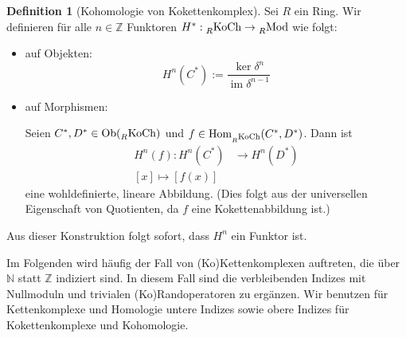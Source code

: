 \documentclass[a4paper,twoside,10pt]{scrreprt}
\DeclareMathOperator{\img}{im}
\newcommand{\Z}{\mathbb{Z}}
\newcommand{\N}{\mathbb{N}}
\theoremstyle{definition}
\newtheorem{definition}[satz]{Definition}
\begin{document}
\begin{definition}[Kohomologie von Kokettenkomplex]\label{def:DefCohomCochain}
Sei $R$ ein Ring. Wir definieren für alle $n\in \Z$ Funktoren $H^*:\prescript{}{R}{\text{KoCh}}\to \prescript{}{R}{\text{Mod}}$ wie folgt:
\begin{itemize}
\item auf Objekten:
\begin{equation*}
H^n(C^*):=\frac{\ker\delta^n}{\img\delta^{n-1}}
\end{equation*}
\item auf Morphismen:\par
Seien $C^*,D^*\in \text{Ob}(\prescript{}{R}{\text{KoCh}})$ und $f\in \text{Hom}_{\prescript{}{R}{\text{KoCh}}}(C^*,D^*)$. Dann ist 
\begin{align*}
H^n(f):H^n(C^*)&\to H^n(D^*)\\
[x]\mapsto [f(x)]
\end{align*}
eine wohldefinierte, lineare Abbildung. (Dies folgt aus der universellen Eigenschaft von Quotienten, da $f$ eine Kokettenabbildung ist.)
\end{itemize}
Aus dieser Konstruktion folgt sofort, dass $H^n$ ein Funktor ist.
\end{definition}
Im Folgenden wird häufig der Fall von (Ko)Kettenkomplexen auftreten, die über $\N$ statt $\Z$ indiziert sind. In diesem Fall sind die verbleibenden Indizes mit Nullmoduln und trivialen (Ko)Randoperatoren zu ergänzen. Wir benutzen für Kettenkomplexe und Homologie untere Indizes sowie obere Indizes für Kokettenkomplexe und Kohomologie.
\end{document}
